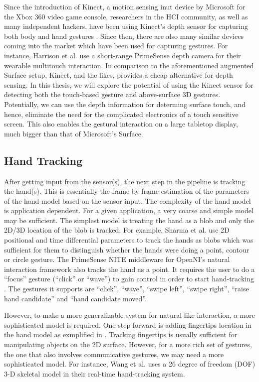 Since the introduction of Kinect, a motion sensing inut device by Microsoft for
the Xbox 360 video game console, researchers in the HCI community, as well as
many independent hackers, have been using Kinect's depth sensor for capturing
both body and hand gestures \cite{openni}. Since then, there are also many
similar devices coming into the market which have been used for capturing
gestures. For instance, Harrison et al. \cite{harrison11} use  a short-range
PrimeSense \cite{primesense} depth camera for their wearable multitouch
interaction. In comparison to the aforementioned augmented Surface setup,
Kinect, and the likes, provides a cheap alternative for depth sensing. In this
thesis, we will explore the potential of using the Kinect sensor for detecting 
both the touch-based gesture and above-surface 3D gestures. Potentially, we can 
use the depth information for determing surface touch, and hence, eliminate the 
need for the complicated electronics of a touch sensitive screen. This also 
enables the gestural interaction on a large tabletop display, much bigger than 
that of Microsoft's Surface.

\subsection{Hand Tracking}
After getting input from the sensor(s), the next step in the pipeline is
tracking the hand(s). This is essentially the frame-by-frame estimation of the
parameters of the hand model based on the sensor input. The complexity of the
hand model is application dependent. For a given application, a very coarse and
simple model may be sufficient. The simplest model is treating the hand as a
blob and only the 2D/3D location of the blob is tracked. For example, Sharma et
al. \cite{sharma00} use 2D positional and time differential parameters to track
the hands as blobs which was sufficient for them to distinguish whether the
hands were doing a point, contour or circle gesture. The PrimeSense NITE
middleware for OpenNI's natural interaction framework also tracks the hand as a
point. It requires the user to do a ``focus'' gesture (``click'' or ``wave'')
to gain control in order to start hand-tracking \cite{primesense-manual}. The
gestures it supports are ``click'', ``wave'', ``swipe left'', ``swipe right'', 
``raise hand candidate'' and ``hand candidate moved''.

However, to make a more generalizable system for natural-like interaction, a
more sophisticated model is required. One step forward is adding fingertips
location in the hand model as exmplified in \cite{Oka02} \cite{harrison11}
\cite{larson11}. Tracking fingertips is usually sufficient for manipulating
objects on the 2D surface. However, for a more rich set of gestures, the one
that also involves communicative gestures, we may need a more sophisticated
model. For instance, Wang et al. \cite{Wang09} uses a 26 degree of freedom (DOF)
3-D skeletal model in their real-time hand-tracking system. 

